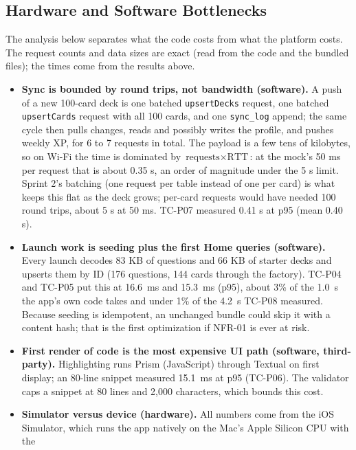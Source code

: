 \documentclass[12pt,letterpaper]{article}
\begin{document}
\subsection{Hardware and Software Bottlenecks}\label{sec:bottlenecks}
The analysis below separates what the code costs from what the platform costs. The
request counts and data sizes are exact (read from the code and the bundled files);
the times come from the results above.
\begin{itemize}
  \item \textbf{Sync is bounded by round trips, not bandwidth (software).} A push of a
        new 100-card deck is one batched \texttt{upsertDecks} request, one batched
        \texttt{upsertCards} request with all 100 cards, and one \texttt{sync\_log}
        append; the same cycle then pulls changes, reads and possibly writes the
        profile, and pushes weekly XP, for 6 to 7 requests in total. The payload is a
        few tens of kilobytes, so on Wi-Fi the time is dominated by
        $\text{requests} \times \text{RTT}$: at the mock's 50 ms per request that is
        about 0.35 s, an order of magnitude under the 5 s limit. Sprint 2's batching
        (one request per table instead of one per card) is what keeps this flat as the
        deck grows; per-card requests would have needed 100 round trips, about 5 s at
        50 ms. TC-P07 measured 0.41 s at p95 (mean 0.40 s).
  \item \textbf{Launch work is seeding plus the first Home queries (software).} Every
        launch decodes 83 KB of questions and 66 KB of starter decks and upserts them
        by ID (176 questions, 144 cards through the factory). TC-P04 and TC-P05 put
        this at 16.6~ms and 15.3~ms (p95), about 3\% of the 1.0~s the app's own code
        takes and under 1\% of the 4.2~s TC-P08 measured. Because seeding is idempotent, an unchanged bundle could
        skip it with a content hash; that is the first optimization if NFR-01 is ever
        at risk.
  \item \textbf{First render of code is the most expensive UI path (software,
        third-party).} Highlighting runs Prism (JavaScript) through Textual on first
        display; an 80-line snippet measured 15.1~ms at p95 (TC-P06). The validator caps a
        snippet at 80 lines and 2,000 characters, which bounds this cost.
  \item \textbf{Simulator versus device (hardware).} All numbers come from the iOS
        Simulator, which runs the app natively on the Mac's Apple Silicon CPU with the

\end{itemize}
\end{document}
